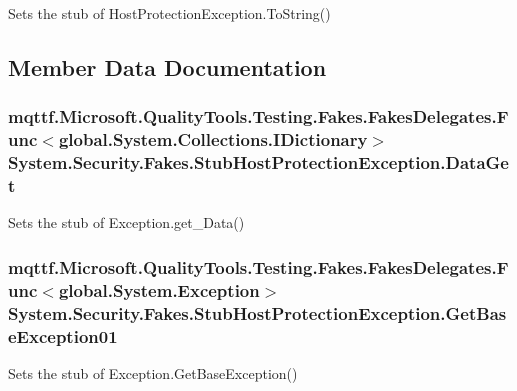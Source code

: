 Sets the stub of Host\-Protection\-Exception.\-To\-String()



\subsection{Member Data Documentation}
\hypertarget{class_system_1_1_security_1_1_fakes_1_1_stub_host_protection_exception_a9aac9635022c39ce445186d95a0af105}{
\subsubsection[{Data\-Get}]{\setlength{\rightskip}{0pt plus 5cm}mqttf.\-Microsoft.\-Quality\-Tools.\-Testing.\-Fakes.\-Fakes\-Delegates.\-Func$<$global.\-System.\-Collections.\-I\-Dictionary$>$ System.\-Security.\-Fakes.\-Stub\-Host\-Protection\-Exception.\-Data\-Get}}\label{class_system_1_1_security_1_1_fakes_1_1_stub_host_protection_exception_a9aac9635022c39ce445186d95a0af105}


Sets the stub of Exception.\-get\-\_\-\-Data()

\hypertarget{class_system_1_1_security_1_1_fakes_1_1_stub_host_protection_exception_a061ff5cff97809754f4c28b8169ffda1}{
\subsubsection[{Get\-Base\-Exception01}]{\setlength{\rightskip}{0pt plus 5cm}mqttf.\-Microsoft.\-Quality\-Tools.\-Testing.\-Fakes.\-Fakes\-Delegates.\-Func$<$global.\-System.\-Exception$>$ System.\-Security.\-Fakes.\-Stub\-Host\-Protection\-Exception.\-Get\-Base\-Exception01}}\label{class_system_1_1_security_1_1_fakes_1_1_stub_host_protection_exception_a061ff5cff97809754f4c28b8169ffda1}


Sets the stub of Exception.\-Get\-Base\-Exception()

